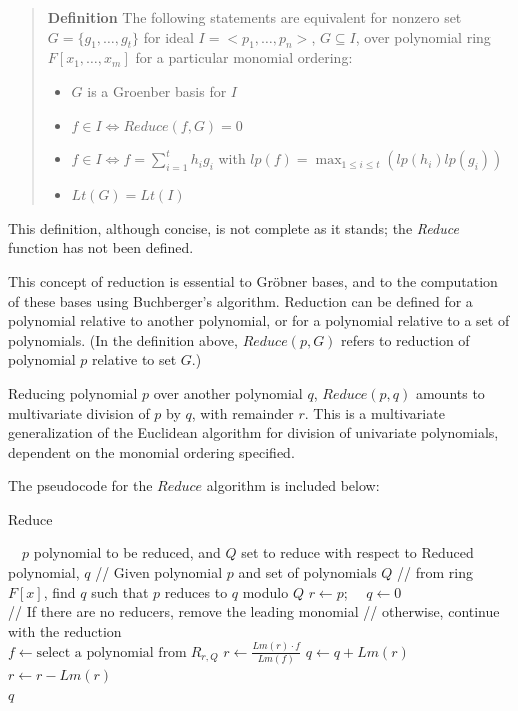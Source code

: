 \documentclass[letterpaper,12pt,titlepage,oneside,final]{book}
\newenvironment{defn}{\begin{quote}%
  \textbf{Definition }%
  \quad
}{%
\end{quote}%
}
\begin{document}
\begin{defn}\label{Groebner Basis}
  The following statements are equivalent for nonzero set ${G = \{g_1, \ldots, g_t\}}$ for ideal $I = <p_1, \ldots, p_n>$, ${G \subseteq I}$, over polynomial ring $F[x_1, \ldots, x_m]$ for a particular monomial ordering:
  \begin{itemize}
    \item ${G}$ is a Groenber basis for ${I}$
    \item ${f \in I \iff Reduce( f, G) = 0}$
    \item ${f \in I \iff f = \sum_{i=1}^{t}h_ig_i}$ with ${lp(f) = \max_{1 \leq i \leq t}(lp(h_i)lp(g_i))}$
    \item ${Lt(G) = Lt(I)}$
  \end{itemize}
\end{defn}

This definition, although concise, is not complete as it stands; the \textit{Reduce} function has not been defined.

This concept of reduction is essential to Gr\"obner bases, and to the computation of these bases using Buchberger's algorithm.  Reduction can be defined for a polynomial relative to another polynomial, or for a polynomial relative to a set of polynomials.  (In the definition above, ${Reduce( p, G)}$ refers to reduction of polynomial ${p}$ relative to set ${G}$.)  

Reducing polynomial ${p}$ over another polynomial ${q}$, ${Reduce( p, q)}$ amounts to multivariate division of ${p}$ by ${q}$, with remainder ${r}$.  This is a multivariate generalization of the Euclidean algorithm for division of univariate polynomials, dependent on the monomial ordering specified.  

The pseudocode for the ${Reduce}$ algorithm is included below:
\begin{algorithm}[H]
\caption{Reduce}\label{reduce}
\begin{algorithmic}[1]
\Input $\quad p$ polynomial to be reduced, and ${Q}$ set to reduce with respect to
\Output Reduced polynomial, ${q}$
\State // Given polynomial ${p}$ and set of polynomials ${Q}$
\State // from ring ${F[x]}$, find ${q}$ such that ${p}$ reduces to ${q}$ modulo ${Q}$
\State $r \gets p$; $\quad q \gets 0$ \\
\State // If there are no reducers, remove the leading monomial
\State // otherwise, continue with the reduction\\
    \State $f \gets \textrm{select a polynomial from}\; R_{r,Q}$
    \State $r \gets \frac{Lm(r) \cdot f}{Lm(f)}$
  \EndWhile
  \State $q \gets q + Lm(r)$
  \State $r \gets r - Lm(r)$
\EndWhile\\
\Return $q$
\EndProcedure
\end{algorithmic}
\end{algorithm}  
\end{document}
